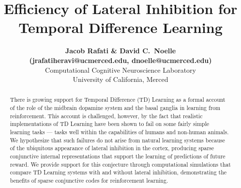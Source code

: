 \documentclass[preprint,12pt,authoryear]{elsarticle}
\begin{document}
\begin{frontmatter}



\title{Efficiency of Lateral Inhibition for Temporal Difference Learning}


\author{{\large \bf Jacob Rafati \& David C.~Noelle} \\
        {\large \bf (jrafatiheravi@ucmerced.edu, dnoelle@ucmerced.edu)} \\
        Computational Cognitive Neuroscience Laboratory \\
        University of California, Merced}

\address{5200 North Lake Road \\
        Merced, CA 95343 USA}

\begin{abstract}
There is growing support for Temporal Difference (TD) Learning as a
formal account of the role of the midbrain dopamine system and the
basal ganglia in learning from reinforcement. This account is
challenged, however, by the fact that realistic implementations of TD
Learning have been shown to fail on some fairly simple learning tasks
--- tasks well within the capabilities of humans and non-human
animals. We hypothesize that such failures do not arise from natural
learning systems because of the ubiquitous appearance of lateral
inhibition in the cortex, producing sparse conjunctive internal
representations that support the learning of predictions of future
reward. We provide support for this conjecture through computational
simulations that compare TD Learning systems with and without lateral
inhibition, demonstrating the benefits of sparse conjunctive codes for
reinforcement learning.
\end{abstract}


\end{frontmatter}
\end{document}
